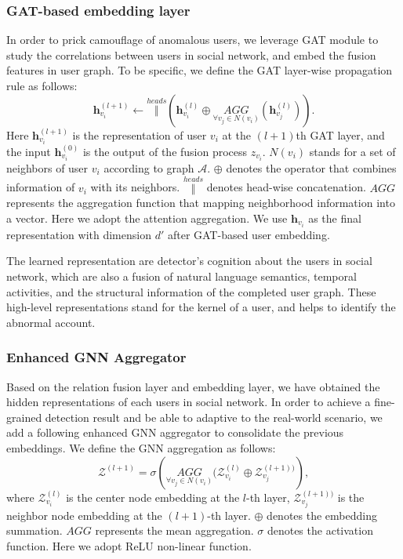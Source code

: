 \documentclass[conference]{IEEEtran}
\theoremstyle{definition}
\begin{document}
\subsubsection{GAT-based embedding layer}
In order to prick camouflage of anomalous users, we leverage GAT module to  study the correlations between users in social network, and embed the fusion features in user graph. To be specific, we define the GAT layer-wise propagation rule as follows:
\begin{equation}
\label{equ:gat}
    \textbf{h}_{v_i}^{(l+1)} \leftarrow  \overset{heads}{\Vert} \left(\textbf{h}_{v_i}^{(l)} \oplus \underset{\forall v_j \in N(v_i)}{AGG}(\textbf{h}_{v_j}^{(l)}) \right).
\end{equation}
Here $\textbf{h}_{v_i}^{(l+1)}$ is the representation of user $v_i$ at the $(l+1)$th GAT layer, and the input $\textbf{h}_{v_i}^{(0)}$ is the output of the fusion process $z_{v_i}$.
$N(v_i)$ stands for a set of neighbors of user $v_i$ according to graph $\mathcal{A}$. $\oplus$ denotes the operator that combines information of $v_i$ with its neighbors. $\overset{heads}{\Vert}$ denotes head-wise concatenation. $AGG$ represents the aggregation function that mapping neighborhood information into a vector. Here we adopt the attention aggregation. We use $\textbf{h}_{v_i}$ as the final representation with dimension $d'$ after GAT-based user embedding.

The learned representation are detector's cognition about the users in social network, which are also a fusion of natural language semantics, temporal activities, and the structural information of the completed user graph. These high-level representations stand for the kernel of a user, and helps to identify the abnormal account.


\subsubsection{Enhanced GNN Aggregator}
Based on the relation fusion layer and embedding layer, we have obtained the hidden representations of each users in social network. In order to achieve a fine-grained detection result and be able to adaptive to the real-world scenario, we add a following enhanced GNN aggregator to consolidate the previous embeddings. We define the GNN aggregation as follows:
\begin{equation}
\label{equ:agg}
    \mathcal{Z}^{(l+1)} = \sigma\left(\underset{\forall v_j \in N(v_i)}{AGG} (\mathcal{Z}^{(l)}_{v_i}\oplus \mathcal{Z}^{(l+1))}_{v_j}   \right),
\end{equation}
where $\mathcal{Z}^{(l)}_{v_i}$ is the center node embedding at the $l$-th layer, $\mathcal{Z}^{(l+1))}_{v_j}$ is the neighbor node embedding at the $(l+1)$-th layer. 
$\oplus$ denotes the embedding summation. $AGG$ represents the mean aggregation. $\sigma$ denotes the activation function. Here we adopt ReLU non-linear function.
\end{document}
